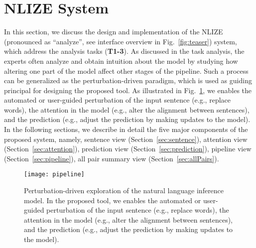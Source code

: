 \section{NLIZE System}
In this section, we discuss the design and implementation of the NLIZE (pronounced as ``analyze'', see interface overview in Fig.~\ref{fig:teaser}) system, which address the analysis tasks (\textbf{T1-3}).
%
As discussed in the task analysis, the experts often analyze and obtain intuition about the model by studying how altering one part of the model affect other stages of the pipeline.
%
Such a process can be generalized as the perturbation-driven paradigm, which is used as guiding principal for designing the proposed tool.
%
As illustrated in Fig.~\ref{fig:modelPipeline}, we enables the automated or user-guided perturbation of the input sentence (e.g., replace words), the attention in the model (e.g., alter the alignment between sentences), and the prediction (e.g., adjust the prediction by making updates to the model).
%
In the following sections, we describe in detail the five major components of the proposed system, namely, sentence view  (Section~\ref{sec:sentence}), attention view (Section~\ref{sec:attention}), prediction view (Section~\ref{sec:prediction}), pipeline view (Section~\ref{sec:pipeline}), all pair summary view (Section~\ref{sec:allPairs}).


\begin{figure}[htbp]
\centering
 \texttt{[image: pipeline]}
 \caption{
Perturbation-driven exploration of the natural language inference model.
In the proposed tool, we enables the automated or user-guided perturbation of the input sentence (e.g., replace words), the attention in the model (e.g., alter the alignment between sentences), and the prediction (e.g., adjust the prediction by making updates to the model).
}
\label{fig:modelPipeline}
\end{figure}

%
